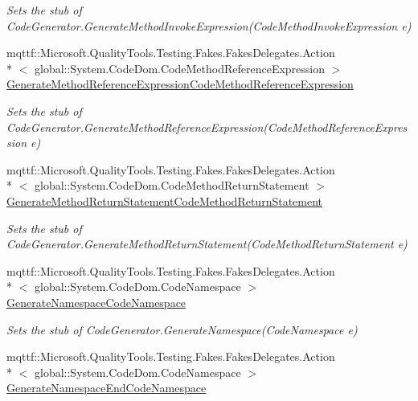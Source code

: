 \begin{DoxyCompactItemize}
\begin{DoxyCompactList}\small\item\em Sets the stub of Code\-Generator.\-Generate\-Method\-Invoke\-Expression(\-Code\-Method\-Invoke\-Expression e)\end{DoxyCompactList}\item 
mqttf\-::\-Microsoft.\-Quality\-Tools.\-Testing.\-Fakes.\-Fakes\-Delegates.\-Action\\*
$<$ global\-::\-System.\-Code\-Dom.\-Code\-Method\-Reference\-Expression $>$ \hyperlink{class_system_1_1_code_dom_1_1_compiler_1_1_fakes_1_1_stub_code_generator_aa31e1204fa115d479a03a406b7ecabad}{Generate\-Method\-Reference\-Expression\-Code\-Method\-Reference\-Expression}
\begin{DoxyCompactList}\small\item\em Sets the stub of Code\-Generator.\-Generate\-Method\-Reference\-Expression(\-Code\-Method\-Reference\-Expression e)\end{DoxyCompactList}\item 
mqttf\-::\-Microsoft.\-Quality\-Tools.\-Testing.\-Fakes.\-Fakes\-Delegates.\-Action\\*
$<$ global\-::\-System.\-Code\-Dom.\-Code\-Method\-Return\-Statement $>$ \hyperlink{class_system_1_1_code_dom_1_1_compiler_1_1_fakes_1_1_stub_code_generator_a6ce162870c5a40e7fd44008f2d8e5cb3}{Generate\-Method\-Return\-Statement\-Code\-Method\-Return\-Statement}
\begin{DoxyCompactList}\small\item\em Sets the stub of Code\-Generator.\-Generate\-Method\-Return\-Statement(\-Code\-Method\-Return\-Statement e)\end{DoxyCompactList}\item 
mqttf\-::\-Microsoft.\-Quality\-Tools.\-Testing.\-Fakes.\-Fakes\-Delegates.\-Action\\*
$<$ global\-::\-System.\-Code\-Dom.\-Code\-Namespace $>$ \hyperlink{class_system_1_1_code_dom_1_1_compiler_1_1_fakes_1_1_stub_code_generator_ad8d6b6c71cd424b84a857c1855fbf13e}{Generate\-Namespace\-Code\-Namespace}
\begin{DoxyCompactList}\small\item\em Sets the stub of Code\-Generator.\-Generate\-Namespace(\-Code\-Namespace e)\end{DoxyCompactList}\item 
mqttf\-::\-Microsoft.\-Quality\-Tools.\-Testing.\-Fakes.\-Fakes\-Delegates.\-Action\\*
$<$ global\-::\-System.\-Code\-Dom.\-Code\-Namespace $>$ \hyperlink{class_system_1_1_code_dom_1_1_compiler_1_1_fakes_1_1_stub_code_generator_a23557201dbbd7fd6b67d44d56219475e}{Generate\-Namespace\-End\-Code\-Namespace}

\end{DoxyCompactItemize}
